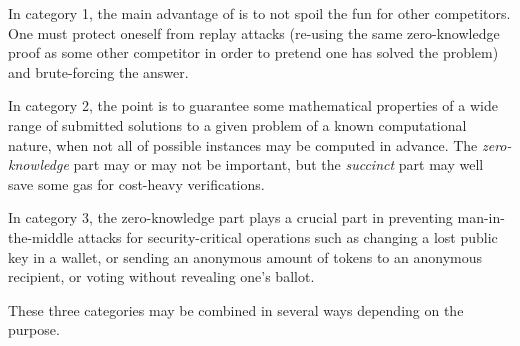 \documentclass[10pt,a4paper]{article}
\begin{document}
In category 1, the main advantage of \zksnarks{} is to not spoil the fun for other competitors. One must protect oneself from replay attacks (re-using the same zero-knowledge proof as some other competitor in order to pretend one has solved the problem) and brute-forcing the answer.

In category 2, the point is to guarantee some mathematical properties of a wide range of submitted solutions to a given problem of a known computational nature, when not all of possible instances may be computed in advance. The \emph{zero-knowledge} part may or may not be important, but the \emph{succinct} part may well save some gas for cost-heavy verifications.

In category 3, the zero-knowledge part plays a crucial part in preventing man-in-the-middle attacks for security-critical operations such as changing a lost public key in a wallet, or sending an anonymous amount of tokens to an anonymous recipient, or voting without revealing one's ballot.

These three categories may be combined in several ways depending on the purpose.
\end{document}
